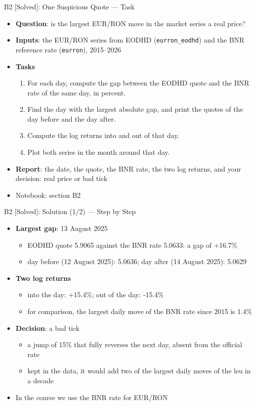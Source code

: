 \begin{frame}{B2 [Solved]: One Suspicious Quote --- Task}
\itemsize{\small}
\begin{itemize}
\item \textbf{Question}: is the largest EUR/RON move in the market series a real price?
\item \textbf{Inputs}: the EUR/RON series from EODHD (\texttt{eurron\_eodhd}) and the BNR reference rate (\texttt{eurron}), 2015--2026
\item \textbf{Tasks}
\begin{enumerate}
    \item For each day, compute the gap between the EODHD quote and the BNR rate of the same day, in percent.
    \item Find the day with the largest absolute gap, and print the quotes of the day before and the day after.
    \item Compute the log returns into and out of that day.
    \item Plot both series in the month around that day.
\end{enumerate}
\item \textbf{Report}: the date, the quote, the BNR rate, the two log returns, and your decision: real price or bad tick
\item Notebook: section B2
\end{itemize}
\end{frame}

\begin{frame}{B2 [Solved]: Solution (1/2) --- Step by Step}
\itemsize{\small}
\begin{itemize}
    \item \textbf{Largest gap}: 13 August 2025
    \begin{itemize}
        \item EODHD quote 5.9065 against the BNR rate 5.0633: a gap of +16.7\%
        \item day before (12 August 2025): 5.0636; day after (14 August 2025): 5.0629
    \end{itemize}
    \item \textbf{Two log returns}
    \begin{itemize}
        \item into the day: +15.4\%; out of the day: -15.4\%
        \item for comparison, the largest daily move of the BNR rate since 2015 is 1.4\%
    \end{itemize}
    \item \textbf{Decision}: a bad tick
    \begin{itemize}
        \item a jump of 15\% that fully reverses the next day, absent from the official rate
        \item kept in the data, it would add two of the largest daily moves of the leu in a decade
    \end{itemize}
    \item In the course we use the BNR rate for EUR/RON
\end{itemize}
\end{frame}

